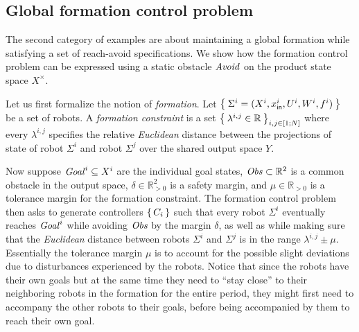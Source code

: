 \subsection{Global formation control problem}\label{sec:global formation control}

The second category of examples are about maintaining a global formation while satisfying a set of reach-avoid specifications.
We show how the formation control problem can be expressed using a static obstacle $\mathit{Avoid}$ on the product state space $X^\times$.

Let us first formalize the notion of \emph{formation}.
Let $\Set{\Sigma^i=(X^i,x_{\mathsf{in}}^i,U^i,W^i,f^i)}$ be a set of robots.
A \emph{formation constraint} is a set $\Set{\lambda^{i,j}\in \mathbb{R}}_{i,j\in [1;N]}$ where every $\lambda^{i,j}$ specifies the relative \emph{Euclidean} 
distance between the projections of state of robot $\Sigma^i$ and robot $\Sigma^j$  over the shared output space $Y$.

Now suppose $\mathit{Goal}^i\subseteq X^i$ are the individual goal states, $\mathit{Obs}\subset \mathbb{R}^2$ is a common obstacle in the  output space, 
$\delta \in \mathbb{R}^2_{>0}$ is a safety margin, and $\mu\in \mathbb{R}_{>0}$ is a tolerance margin for the formation constraint.
The formation control problem then asks to generate controllers $\set{C_i}$ such that every robot $\Sigma^i$ eventually reaches $\mathit{Goal}^i$ while avoiding $\mathit{Obs}$ 
by the margin $\delta$, as well as while making sure that the \emph{Euclidean} distance between robots $\Sigma^i$ and $\Sigma^j$ is in the range $\lambda^{i,j} \pm \mu$.
Essentially the tolerance margin $\mu$ is to account for the possible slight deviations due to disturbances experienced by the robots. 
Notice that since the robots have their own goals but at the same time they need to ``stay close'' to their neighboring robots in the formation for the entire period, 
they might first need to accompany the other robots to their goals, before being accompanied by them to reach their own goal.

